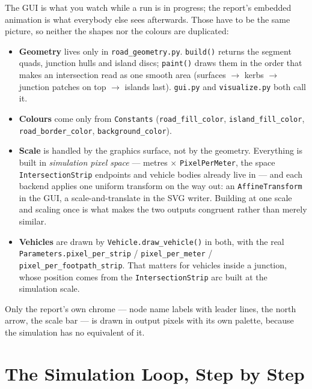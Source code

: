 \documentclass[11pt, a4paper]{article}
\newcommand{\code}[1]{\texttt{#1}}
\begin{document}
The GUI is what you watch while a run is in progress; the report's embedded
animation is what everybody else sees afterwards. Those have to be the same
picture, so neither the shapes nor the colours are duplicated:

\begin{itemize}
    \item \textbf{Geometry} lives only in \code{road\_geometry.py}.
          \code{build()} returns the segment quads, junction hulls and island
          discs; \code{paint()} draws them in the order that makes an
          intersection read as one smooth area (surfaces $\rightarrow$ kerbs
          $\rightarrow$ junction patches on top $\rightarrow$ islands last).
          \code{gui.py} and \code{visualize.py} both call it.
    \item \textbf{Colours} come only from \code{Constants}
          (\code{road\_fill\_color}, \code{island\_fill\_color},
          \code{road\_border\_color}, \code{background\_color}).
    \item \textbf{Scale} is handled by the graphics surface, not by the
          geometry. Everything is built in \emph{simulation pixel space} ---
          metres $\times$ \code{PixelPerMeter}, the space
          \code{IntersectionStrip} endpoints and vehicle bodies already live in
          --- and each backend applies one uniform transform on the way out: an
          \code{AffineTransform} in the GUI, a scale-and-translate in the SVG
          writer. Building at one scale and scaling once is what makes the two
          outputs congruent rather than merely similar.
    \item \textbf{Vehicles} are drawn by \code{Vehicle.draw\_vehicle()} in both,
          with the real \code{Parameters.pixel\_per\_strip} /
          \code{pixel\_per\_meter} / \code{pixel\_per\_footpath\_strip}. That
          matters for vehicles inside a junction, whose position comes from the
          \code{IntersectionStrip} arc built at the simulation scale.
\end{itemize}

Only the report's own chrome --- node name labels with leader lines, the north
arrow, the scale bar --- is drawn in output pixels with its own palette, because
the simulation has no equivalent of it.

\section{The Simulation Loop, Step by Step}
\label{sec:loop}
\end{document}
